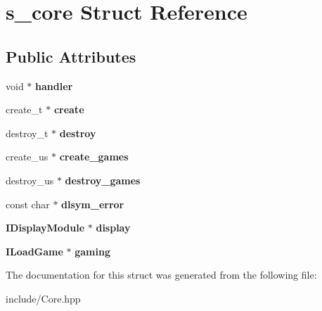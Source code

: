 \section{s\+\_\+core Struct Reference}
\label{structs__core}
\subsection*{Public Attributes}
\begin{DoxyCompactItemize}
\item 
\mbox{\label{structs__core_ad77d662a6349440d2c414b0874b16562}} 
void $\ast$ {\bfseries handler}
\item 
\mbox{\label{structs__core_aa70da68357d19de866adadab0fdc5c8c}} 
create\+\_\+t $\ast$ {\bfseries create}
\item 
\mbox{\label{structs__core_a8aaef7788fcdd4e3684714486c7f5dc0}} 
destroy\+\_\+t $\ast$ {\bfseries destroy}
\item 
\mbox{\label{structs__core_af333475be6031916e6d2cae13bd52f8d}} 
create\+\_\+us $\ast$ {\bfseries create\+\_\+games}
\item 
\mbox{\label{structs__core_a4ad162483bde6a04c8743987f0bea287}} 
destroy\+\_\+us $\ast$ {\bfseries destroy\+\_\+games}
\item 
\mbox{\label{structs__core_a6b62d1e9e55a47a22159854074c06c8f}} 
const char $\ast$ {\bfseries dlsym\+\_\+error}
\item 
\mbox{\label{structs__core_a8573db6f1eba9454687fa0b8af897313}} 
\textbf{ I\+Display\+Module} $\ast$ {\bfseries display}
\item 
\mbox{\label{structs__core_a857af41c606dbd822b76b64a18714768}} 
\textbf{ I\+Load\+Game} $\ast$ {\bfseries gaming}
\end{DoxyCompactItemize}


The documentation for this struct was generated from the following file\+:\begin{DoxyCompactItemize}
\item 
include/Core.\+hpp\end{DoxyCompactItemize}

